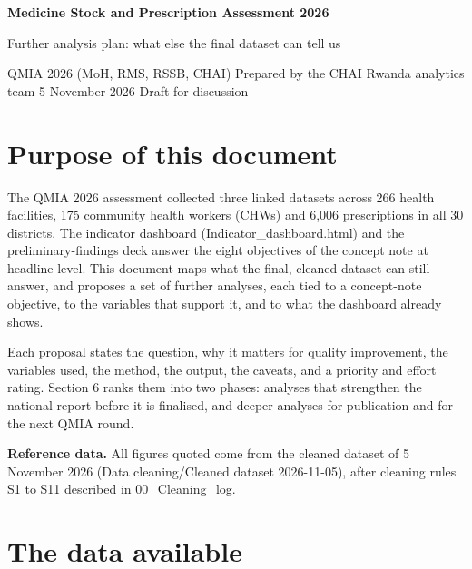 \documentclass[10pt,a4paper]{article}
\begin{document}
\begin{titlepage}\vspace*{3cm}
{\Huge\bfseries\color{navy} Medicine Stock and Prescription Assessment 2026\par}\vspace{8pt}
{\Large\color{navy} Further analysis plan: what else the final dataset can tell us\par}\vspace{14pt}
{\small\color{gray} QMIA 2026 (MoH, RMS, RSSB, CHAI) \textperiodcentered{} Prepared by the CHAI Rwanda analytics team \textperiodcentered{} 5 November 2026 \textperiodcentered{} Draft for discussion\par}
\end{titlepage}
\tableofcontents\newpage

\section{Purpose of this document}
The QMIA 2026 assessment collected three linked datasets across 266 health facilities, 175 community health workers (CHWs) and 6,006 prescriptions in all 30 districts. The indicator dashboard (Indicator\_dashboard.html) and the preliminary-findings deck answer the eight objectives of the concept note at headline level. This document maps what the final, cleaned dataset can still answer, and proposes a set of further analyses, each tied to a concept-note objective, to the variables that support it, and to what the dashboard already shows.

Each proposal states the question, why it matters for quality improvement, the variables used, the method, the output, the caveats, and a priority and effort rating. Section 6 ranks them into two phases: analyses that strengthen the national report before it is finalised, and deeper analyses for publication and for the next QMIA round.

\textbf{Reference data.} All figures quoted come from the cleaned dataset of 5 November 2026 (Data cleaning/Cleaned dataset 2026-11-05), after cleaning rules S1 to S11 described in 00\_Cleaning\_log.

\section{The data available}
\end{document}
